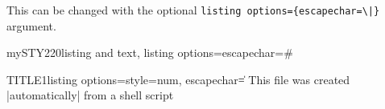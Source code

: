\documentclass[]{myHOWTO-V001}
\begin{document}
This can be changed with the optional \verb#listing options={escapechar=\|}# argument.

\begin{myTEXEXdoclst}{mySTY220}{listing and text, listing options={escapechar=\#}}
\begin{myOUTlst}{TITLE1}{listing options={style=num, escapechar=\|}}
This file was created |{\color{red}automatically}| from
a shell script
\end{myOUTlst}
\end{myTEXEXdoclst}

%
%

\clearpage
\pagestyle{empty}
\printbibliography[heading=bibnumbered]
\clearpage
\pagestyle{plain}

%
%
\end{document}
